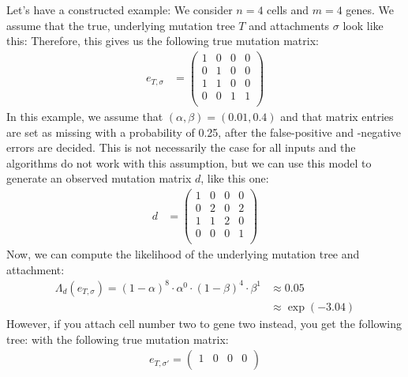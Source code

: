 \begin{example}
    \label{exmpl:scite_problem}
    Let's have a constructed example: We consider $n = 4$ cells and $m = 4$ genes. We assume that the true, underlying mutation tree $T$ and attachments $\sigma$ look like this:
    Therefore, this gives us the following true mutation matrix:
    \begin{align*}
        e_{T, \sigma} &= \begin{pmatrix}
            1 & 0 & 0 & 0 \\
            0 & 1 & 0 & 0 \\
            1 & 1 & 0 & 0 \\
            0 & 0 & 1 & 1 \\
        \end{pmatrix}
    \end{align*}
    In this example, we assume that $(\alpha, \beta) = (0.01, 0.4)$ and that matrix entries are set as missing with a probability of 0.25, after the false-positive and -negative errors are decided. This is not necessarily the case for all inputs and the algorithms do not work with this assumption, but we can use this model to generate an observed mutation matrix $d$, like this one:
    \begin{align*}
        d &= \begin{pmatrix}
            1 & 0 & 0 & 0 \\
            0 & 2 & 0 & 2 \\
            1 & 1 & 2 & 0 \\
            0 & 0 & 0 & 1 \\
        \end{pmatrix}
    \end{align*}
    Now, we can compute the likelihood of the underlying mutation tree and attachment:
    \begin{align*}
        \Lambda_d(e_{T, \sigma}) = (1-\alpha)^{8} \cdot \alpha^{0} \cdot (1-\beta)^{4} \cdot \beta^{1} &\approx 0.05 \\
        &\approx \exp(-3.04)
    \end{align*}
    However, if you attach cell number two to gene two instead, you get the following tree:
    with the following true mutation matrix:
    \begin{align*}
        e_{T, \sigma'} = \begin{pmatrix}
            1 & 0 & 0 & 0 \\

\end{pmatrix}
\end{align*}
\end{example}
